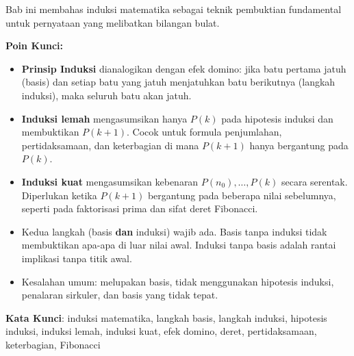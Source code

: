 \documentclass[../main]{subfiles}
\begin{document}

\begin{rangkuman}
Bab ini membahas induksi matematika sebagai teknik pembuktian fundamental untuk pernyataan yang melibatkan bilangan bulat.

\textbf{Poin Kunci:}
\begin{itemize}
  \item \textbf{Prinsip Induksi} dianalogikan dengan efek domino: jika batu pertama jatuh (basis) dan setiap batu yang jatuh menjatuhkan batu berikutnya (langkah induksi), maka seluruh batu akan jatuh.
  \item \textbf{Induksi lemah} mengasumsikan hanya $P(k)$ pada hipotesis induksi dan membuktikan $P(k+1)$. Cocok untuk formula penjumlahan, pertidaksamaan, dan keterbagian di mana $P(k+1)$ hanya bergantung pada $P(k)$.
  \item \textbf{Induksi kuat} mengasumsikan kebenaran $P(n_0), \ldots, P(k)$ secara serentak. Diperlukan ketika $P(k+1)$ bergantung pada beberapa nilai sebelumnya, seperti pada faktorisasi prima dan sifat deret Fibonacci.
  \item Kedua langkah (basis \textbf{dan} induksi) wajib ada. Basis tanpa induksi tidak membuktikan apa-apa di luar nilai awal. Induksi tanpa basis adalah rantai implikasi tanpa titik awal.
  \item Kesalahan umum: melupakan basis, tidak menggunakan hipotesis induksi, penalaran sirkuler, dan basis yang tidak tepat.
\end{itemize}

\textbf{Kata Kunci}: induksi matematika, langkah basis, langkah induksi, hipotesis induksi, induksi lemah, induksi kuat, efek domino, deret, pertidaksamaan, keterbagian, Fibonacci
\end{rangkuman}

\ifSubfilesClassLoaded{
  \renewcommand{\bibname}{Daftar Pustaka}
  
  
}{}
\end{document}

